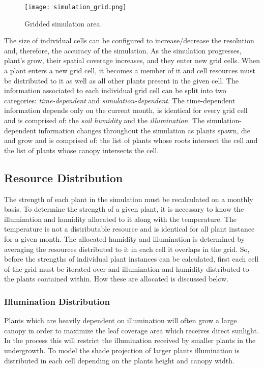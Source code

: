 \begin{figure}
\center
	\texttt{[image: simulation\_grid.png]}
	\caption{ Gridded simulation area.}	
	\label{fig:simulation_grid}
\end{figure}

The size of individual cells can be configured to increase/decrease the resolution and, therefore, the accuracy of the simulation. As the simulation progresses, plant's grow, their spatial coverage increases, and they enter new grid cells. When a plant enters a new grid cell, it becomes a member of it and cell resources must be distributed to it as well as all other plants present in the given cell. The information associated to each individual grid cell can be split into two categories: \textit{time-dependent} and \textit{simulation-dependent}. The time-dependent information depends only on the current month, is identical for every grid cell and is comprised of: the \textit{soil humidity} and the \textit{illumination}. The simulation-dependent information changes throughout the simulation as plants spawn, die and grow and is comprised of: the list of plants whose roots intersect the cell and the list of plants whose canopy intersects the cell.

\subsection{Resource Distribution}

The strength of each plant in the simulation must be recalculated on a monthly basis. To determine the strength of a given plant, it is necessary to know the illumination and humidity allocated to it along with the temperature. The temperature is not a distributable resource and is identical for all plant instance for a given month. The allocated humidity and illumination is determined by averaging the resources distributed to it in each cell it overlaps in the grid. So, before the strengths of individual plant instances can be calculated, first each cell of the grid must be iterated over and illumination and humidity distributed to the plants contained within. How these are allocated is discussed below.

\subsubsection{Illumination Distribution}

Plants which are heavily dependent on illumination will often grow a large canopy in order to maximize the leaf coverage area which receives direct sunlight. In the process this will restrict the illumination received by smaller plants in the undergrowth. To model the shade projection of larger plants illumination is distributed in each cell depending on the plants height and canopy width. 

